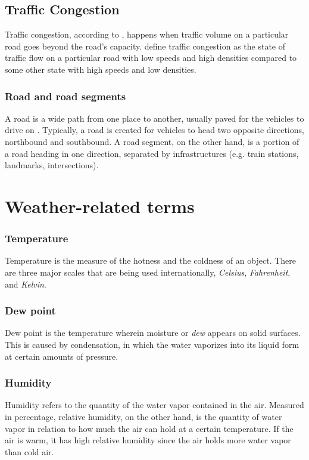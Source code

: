 \subsection{Traffic Congestion}
Traffic congestion, according to , happens when traffic volume on a particular road goes beyond the road’s capacity.  define traffic congestion as the state of traffic flow on a particular road with low speeds and high densities compared to some other state with high speeds and low densities. 

\subsubsection{Road and road segments}
A road is a wide path from one place to another, usually paved for the vehicles to drive on . Typically, a road is created for vehicles to head two opposite directions, northbound and southbound. A road segment, on the other hand, is a portion of a road heading in one direction, separated by infrastructures (e.g. train stations, landmarks, intersections).




\section{Weather-related terms}

\subsubsection{Temperature}
Temperature is the measure of the hotness and the coldness of an object. There are three major scales that are being used internationally, \textit{Celsius}, \textit{Fahrenheit}, and \textit{Kelvin}. 

\subsubsection{Dew point}
Dew point is the temperature wherein moisture or \textit{dew} appears on solid surfaces. This is caused by condensation, in which the water vaporizes into its liquid form at certain amounts of pressure. 

\subsubsection{Humidity}
Humidity refers to the quantity of the water vapor contained in the air. Measured in percentage, relative humidity, on the other hand, is the quantity of water vapor in relation to how much the air can hold at a certain temperature. If the air is warm, it has high relative humidity since the air holds more water vapor than cold air. 

